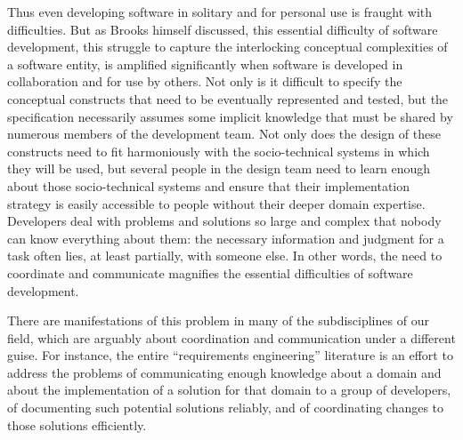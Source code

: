 Thus even developing software in solitary and for personal use is fraught with difficulties. But as Brooks  himself discussed, this essential difficulty of software development, this struggle to capture the interlocking conceptual complexities of a software entity, is amplified significantly when software is developed in collaboration and for use by others. Not only is it difficult to specify the conceptual constructs that need to be eventually represented and tested, but the specification necessarily assumes some implicit knowledge that must be shared by numerous members of the development team. Not only does the design of these constructs need to fit harmoniously with the socio-technical systems in which they will be used, but several people in the design team need to learn enough about those socio-technical systems and ensure that their implementation strategy is easily accessible to people without their deeper domain expertise. Developers deal with problems and solutions so large and complex that nobody can know everything about them: the necessary information and judgment for a task often lies, at least partially, with someone else. In other words, the need to coordinate and communicate magnifies the essential difficulties of software development.

There are manifestations of this problem in many of the subdisciplines of our field, which are arguably about coordination and communication under a different guise. For instance, the entire ``requirements engineering'' literature is an effort to address the problems of communicating enough knowledge about a domain and about the implementation of a solution for that domain to a group of developers, of documenting such potential solutions reliably, and of coordinating changes to those solutions efficiently.

